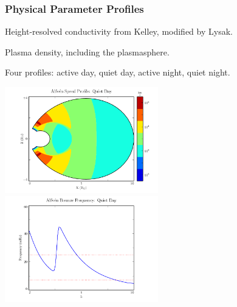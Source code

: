 \documentclass{beamer}
\begin{document}

\begin{frame}
\frametitle{Physical Parameter Profiles}

\begin{wideitemize}
\item Height-resolved conductivity from Kelley, modified by Lysak. 
\item Plasma density, including the plasmasphere. 
\item Four profiles: active day, quiet day, active night, quiet night. 
\end{wideitemize}

\vfill

\includegraphics[width=0.5\textwidth]{figures/va_2.pdf}%
\includegraphics[width=0.5\textwidth]{figures/fa_2.pdf}%

\end{frame}

\end{document}
